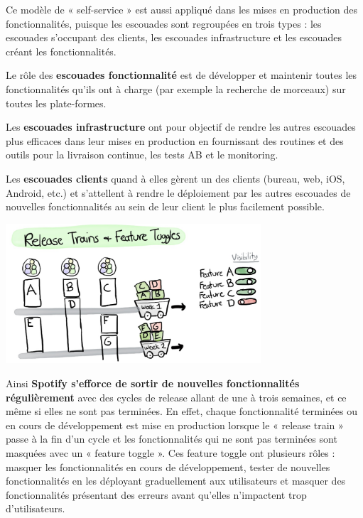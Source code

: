 Ce modèle de « self-service » est aussi appliqué dans les mises en production des fonctionnalités, puisque les escouades sont regroupées en trois types : les escouades s'occupant des clients, les escouades infrastructure et les escouades créant les fonctionnalités.

Le rôle des \textbf{escouades fonctionnalité} est de développer et maintenir toutes les fonctionnalités qu'ils ont à charge (par exemple la recherche de morceaux) sur toutes les plate-formes.

Les \textbf{escouades infrastructure} ont pour objectif de rendre les autres escouades plus efficaces dans leur mises en production en fournissant des routines et des outils pour la livraison continue, les tests AB et le monitoring.

Les \textbf{escouades clients} quand à elles gèrent un des clients (bureau, web, iOS, Android, etc.) et s'attellent à rendre le déploiement par les autres escouades de nouvelles fonctionnalités au sein de leur client le plus facilement possible.

\newpage

\begin{center}
\includegraphics[width=95mm]{./images_spotify/image08}
\end{center}

Ainsi \textbf{Spotify s'efforce de sortir de nouvelles fonctionnalités régulièrement} avec des cycles de release allant de une à trois semaines, et ce même si elles ne sont pas terminées. En effet, chaque fonctionnalité terminées ou en cours de développement est mise en production lorsque le « release train » passe à la fin d'un cycle et les fonctionnalités qui ne sont pas terminées sont masquées avec un « feature toggle ». Ces feature toggle ont plusieurs rôles : masquer les fonctionnalités en cours de développement, tester de nouvelles fonctionnalités en les déployant graduellement aux utilisateurs et masquer des fonctionnalités présentant des erreurs avant qu'elles n'impactent trop d'utilisateurs.

